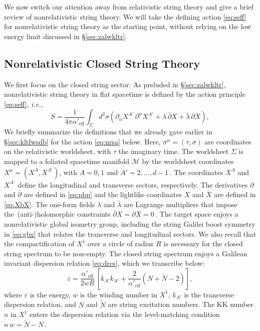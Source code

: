 \documentclass[11pt]{article}
\newcommand{\be}{\begin{equation}}
\newcommand{\ee}{\end{equation}}
\newcommand{\CM}{\mathcal{M}}
\newcommand{\lr}{\left (}
\newcommand{\rr}{\right )}
\newcommand{\ls}{\left [}
\newcommand{\rs}{\right ]}
\newcommand{\p}{\partial}
\renewcommand{\tilde}[1]{\widetilde{#1}}
\begin{document}
We now switch our attention away from relativistic string theory and give a brief review of nonrelativistic string theory. We will take the defining action \eqref{eq:seff} for nonrelativistic string theory as the starting point, without relying on the low energy limit discussed in \S\ref{sec:zalwkltr}. 

\subsection{Nonrelativistic Closed String Theory}\label{enst}

We first focus on the closed string sector. As preluded in \S\ref{sec:zalwkltr}, nonrelativistic string theory in flat spacetime is defined by the action principle \eqref{eq:seff}, \emph{i.e.},
%
\be \label{eq:nrsa}
    S = \frac{1}{4\pi\alpha'_\text{eff}} \int_\Sigma d^2 \sigma \left( \p_\alpha X^{A'} \, \p^\alpha X^{A'} + \lambda \, \bar{\p} X + \bar{\lambda} \, \p \overline{X} \right),
\ee
%
We briefly summarize the definitions that we already gave earlier in \S\ref{sec:kltfwsdb} for the action \eqref{eq:nrsa} below. Here, $\sigma^\alpha = (\tau, \sigma)$ are coordinates on the relativistic worldsheet, with $\tau$ the imaginary time. The worldsheet $\Sigma$ is mapped to a foliated spacetime manifold $\CM$ by the worldsheet coordinates $X^\mu = (X^A,X^{A'})$, with $A = 0,1$ and $A' = 2, \dots, d-1$\,. The coordinates $X^A$ and $X^{A'}$ define the longitudinal and transverse sectors, respectively. 
%
The derivatives $\p$ and $\bar{\p}$ are defined in \eqref{eq:pbp} and the lightlike coordinates $X$ and $\overline{X}$ are defined in \eqref{eq:XbX}. The one-form fields $\lambda$ and $\bar{\lambda}$ are Lagrange multipliers that impose the~(anti-)holomorphic constraints $\bar{\p} X = \p \overline{X} = 0$\,. The target space enjoys a nonrelativistic global isometry group, including the string Galilei boost symmetry in \eqref{eq:gbx} that relates the transverse and longitudinal sectors. 
%
We also recall that the compactification of $X^1$ over a circle of radius $R$ is necessary for the closed string spectrum to be non-empty. 
%
The closed string spectrum enjoys a Galilean invariant dispersion relation \eqref{eq:drcs}, which we transcribe below:
%
\be \label{eq:drcs2}
    \varepsilon = \frac{\alpha'_\text{eff}}{2 w R} \, \ls k_{A'} k_{A'} + \frac{2}{\alpha'_\text{eff}} \lr N + \tilde{N} - 2 \rr \rs,
\ee
%
where $\varepsilon$ is the energy, $w$ is the winding number in $X^1$, $k_{A'}$ is the transverse dispersion relation, and $N$ and $\tilde{N}$ are string excitation numbers. The KK number $n$ in $X^1$ enters the dispersion relation via the level-matching condition $n \, w = \tilde{N} - N$\,.
\end{document}
